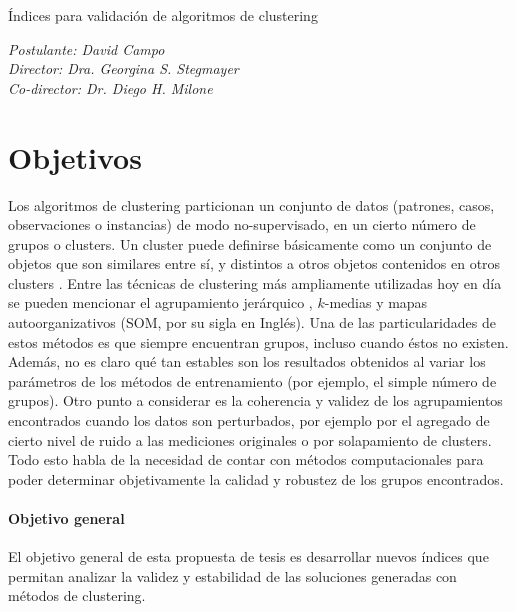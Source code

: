 \documentclass[a4paper,8pt]{article}
\begin{document}
\begin{center}
	{\huge \'Indices para validaci\'on de algoritmos de clustering}
	\vspace{5mm}

	{\itshape Postulante: David Campo\\
		Director: Dra. Georgina S. Stegmayer\\
		Co-director: Dr. Diego H. Milone
	}
\end{center}

\section{Objetivos}
Los algoritmos de clustering particionan un conjunto de datos (patrones, casos, observaciones o instancias) de modo no-supervisado, en un cierto número de grupos o clusters. Un cluster puede definirse básicamente como un conjunto de objetos que son similares entre sí, y distintos a otros objetos contenidos en otros clusters \cite{Xu09}. 
Entre las técnicas de clustering más ampliamente utilizadas hoy en día se pueden mencionar el agrupamiento jerárquico \cite{Souto2008}, $k$-medias \cite{Jain2010} y mapas autoorganizativos (SOM, por su sigla en Inglés)\cite{Stegmayer09, BMC2010}. 
Una de las particularidades de estos métodos es que siempre encuentran grupos, incluso cuando éstos no existen. Además, no es claro qué tan estables son los resultados obtenidos al variar los parámetros de los métodos de entrenamiento (por ejemplo, el simple número de grupos). Otro punto a considerar es la coherencia y validez de los agrupamientos encontrados cuando los datos son perturbados, por ejemplo por el agregado de cierto nivel de ruido a las mediciones originales o por solapamiento de clusters. Todo esto habla de la necesidad de contar con métodos computacionales para poder determinar objetivamente la calidad y robustez de los grupos encontrados.
\paragraph{Objetivo general\\[2mm]}
El objetivo general de esta propuesta de tesis es desarrollar nuevos índices que permitan analizar
la validez y estabilidad de las soluciones generadas con métodos de clustering.
\end{document}
